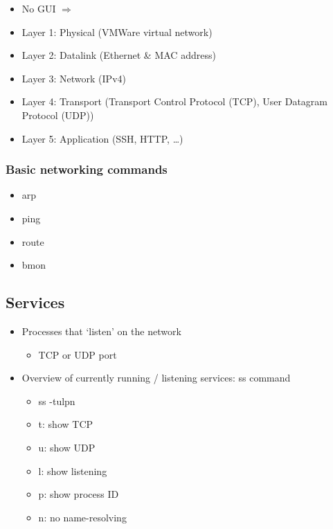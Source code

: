 \documentclass{article}
\begin{document}
\begin{itemize}
    \item No GUI $\Rightarrow$
    \item Layer 1: Physical (VMWare virtual network)
    \item Layer 2: Datalink (Ethernet \& MAC address)
    \item Layer 3: Network (IPv4)
    \item Layer 4: Transport (Transport Control Protocol (TCP), User Datagram Protocol (UDP))
    \item Layer 5: Application (SSH, HTTP, \dots)
\end{itemize}

\subsubsection{Basic networking commands}

\begin{itemize}
    \item arp
    \item ping
    \item route
    \item bmon
\end{itemize}

\subsection{Services}

\begin{itemize}
    \item Processes that `listen' on the network
    \begin{itemize}
        \item TCP or UDP port
    \end{itemize}
    \item Overview of currently running / listening services: ss command
    \begin{itemize}
        \item ss -tulpn
        \item t: show TCP
        \item u: show UDP
        \item l: show listening
        \item p: show process ID
        \item n: no name-resolving
    \end{itemize} 
\end{itemize}
\end{document}
